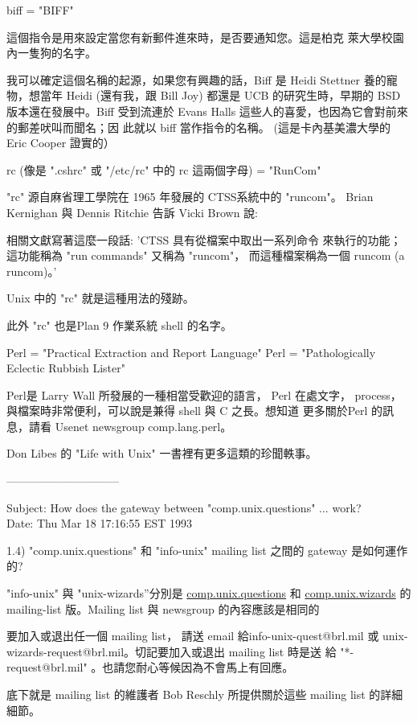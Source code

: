 \documentclass{letter}
\begin{document}
\begin{CJK}{Bg5}{ming}
    biff = "BIFF"

	這個指令是用來設定當您有新郵件進來時，是否要通知您。這是柏克
	萊大學校園內一隻狗的名字。

	    我可以確定這個名稱的起源，如果您有興趣的話，Biff 是 Heidi 
	    Stettner 養的寵物，想當年 Heidi (還有我，跟 Bill Joy) 都還是 
	    UCB 的研究生時，早期的 BSD 版本還在發展中。Biff 受到流連於 
	    Evans Halls 這些人的喜愛，也因為它會對前來的郵差吠叫而聞名；因
	    此就以 biff 當作指令的名稱。
	    (這是卡內基美濃大學的 Eric Cooper 證實的）

    rc (像是 ".cshrc" 或 "/etc/rc" 中的 rc 這兩個字母) = "RunCom"

	"rc" 源自麻省理工學院在 1965 年發展的 CTSS系統中的 "runcom"。
	Brian Kernighan 與 Dennis Ritchie 告訴 Vicki Brown 說: 

	    相關文獻寫著這麼一段話: 'CTSS 具有從檔案中取出一系列命令
	    來執行的功能；這功能稱為 "run commands" 又稱為 "runcom"，
	    而這種檔案稱為一個 runcom (a runcom)。'

	    Unix 中的 "rc" 就是這種用法的殘跡。

	此外 "rc" 也是Plan 9 作業系統 shell 的名字。

    Perl = "Practical Extraction and Report Language"
    Perl = "Pathologically Eclectic Rubbish Lister"

	Perl是 Larry Wall 所發展的一種相當受歡迎的語言， Perl 在處文字， 
	process，與檔案時非常便利，可以說是兼得 shell 與 C 之長。想知道
        更多關於Perl 的訊息，請看 Usenet  newsgroup  comp.lang.perl。

    Don Libes 的 "Life with Unix" 一書裡有更多這類的珍聞軼事。

------------------------------

Subject: How does the gateway between "comp.unix.questions" ... work? \\
Date: Thu Mar 18 17:16:55 EST 1993

1.4)  "comp.unix.questions" 和 "info-unix" mailing list 之間的 
      gateway 是如何運作的?

      "info-unix" 與 "unix-wizards”分別是 \url{comp.unix.questions} 和 
      \url{comp.unix.wizards} 的 mailing-list 版。Mailing list 與 
      newsgroup 的內容應該是相同的

      要加入或退出任一個 mailing list， 請送 email 給info-unix-quest@brl.mil 
      或 unix-wizards-request@brl.mil。切記要加入或退出 mailing list 時是送
      給 "*-request@brl.mil" 。也請您耐心等候因為不會馬上有回應。
        
      底下就是 mailing list 的維護者 Bob Reschly 所提供關於這些 mailing list 
      的詳細細節。


\end{CJK}
\end{document}
